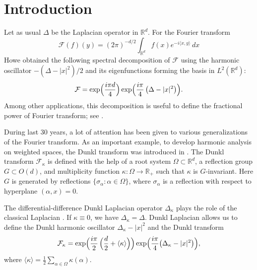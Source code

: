 \documentclass[12pt,twoside,reqno]{amsart}\usepackage[cp1251]{inputenc}
\theoremstyle{plain}
\theoremstyle{remark}
\begin{document}
\maketitle
\section{Introduction}
Let as usual $\Delta$ be the Laplacian operator  in $\mathbb{R}^{d}$.
For the Fourier transform %
\[
\mathcal{F}(f)(y)=(2\pi)^{-d/2}\int_{\mathbb{R}^{d}}f(x)e^{-i\langle x,y\rangle}\,dx
\]
Howe \cite{Ho87} obtained the following spectral decomposition of  $\mathcal{F}$
using the harmonic oscillator $-({\Delta-|x|^2})/2$
and its eigenfunctions forming the basis in $L^{2}(\mathbb{R}^{d})$:
\[
\mathcal{F}=\exp\Bigl(\frac{i\pi
d}{4}\Bigr)\exp\Bigl(\frac{i\pi}{4}\,\bigl(\Delta-|x|^{2}\bigr)\Bigr).
\]
Among other applications,
this decomposition is useful %
  to define the fractional power of Fourier transform; see \cite{SKO12,KM11}.


During last 30 years, a lot of attention has been given to various generalizations of the Fourier transform.
As an important example, to develop harmonic analysis on weighted spaces, the  Dunkl transform was introduced in \cite{Du92}.
  The Dunkl transform  $\mathcal{F}_\kappa$ is defined  with the help of a root system $\Omega\subset\mathbb{R}^{d}$, a reflection group $G\subset O(d)$,
and multiplicity function $\kappa\colon \Omega\to \mathbb{R}_+$ such that $\kappa$ is $G$-invariant.
 Here $G$ is
 generated by reflections $\{\sigma_{\alpha}\colon \alpha\in \Omega\}$,
where $\sigma_{\alpha}$ is a reflection with respect to hyperplane $(\alpha,x)=0$.


The differential-difference Dunkl Laplacian operator $\Delta_{\kappa}$ plays
the role of the classical Laplacian \cite{Ro02}. If $\kappa\equiv 0$, we have
$\Delta_{\kappa}=\Delta$. Dunkl Laplacian allows us to define the Dunkl
harmonic oscillator $\Delta_{\kappa}-|x|^{2}$ and the Dunkl transform
\[
\mathcal{F}_{\kappa}=\exp\Bigl(\frac{i\pi}{2}\,\Bigl(\frac{d}{2}+\langle \kappa\rangle\Bigr)\Bigr)
\exp\Bigl(\frac{i\pi}{4}\bigl(\Delta_{\kappa}-|x|^{2}\bigr)\Bigr),
\]
where $\langle \kappa\rangle=\frac{1}{2}\sum_{\alpha\in
\Omega}\kappa(\alpha)$.
\end{document}
